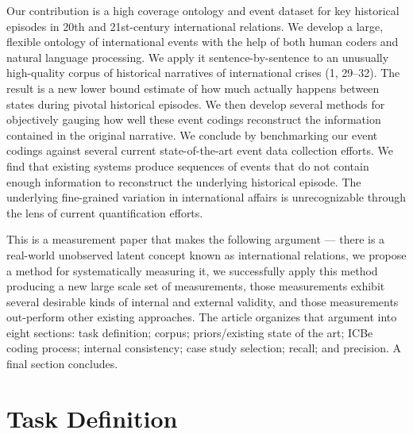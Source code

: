 \documentclass{article}
\begin{document}
Our contribution is a high coverage ontology and event dataset for key
historical episodes in 20th and 21st-century international relations. We
develop a large, flexible ontology of international events with the help
of both human coders and natural language processing. We apply it
sentence-by-sentence to an unusually high-quality corpus of historical
narratives of international crises (1, 29--32). The result is a new
lower bound estimate of how much actually happens between states during
pivotal historical episodes. We then develop several methods for
objectively gauging how well these event codings reconstruct the
information contained in the original narrative. We conclude by
benchmarking our event codings against several current state-of-the-art
event data collection efforts. We find that existing systems produce
sequences of events that do not contain enough information to
reconstruct the underlying historical episode. The underlying
fine-grained variation in international affairs is unrecognizable
through the lens of current quantification efforts.

This is a measurement paper that makes the following argument --- there
is a real-world unobserved latent concept known as international
relations, we propose a method for systematically measuring it, we
successfully apply this method producing a new large scale set of
measurements, those measurements exhibit several desirable kinds of
internal and external validity, and those measurements out-perform other
existing approaches. The article organizes that argument into eight
sections: task definition; corpus; priors/existing state of the art;
ICBe coding process; internal consistency; case study selection; recall;
and precision. A final section concludes.

\hypertarget{task-definition}{%
\section*{Task Definition}\label{task-definition}}
\end{document}
